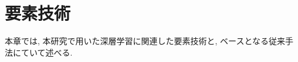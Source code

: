 \chapter{要素技術}
\label{chap:technology}
%
本章では, 本研究で用いた深層学習に関連した要素技術と, ベースとなる従来手法にていて述べる.
%
%





%
